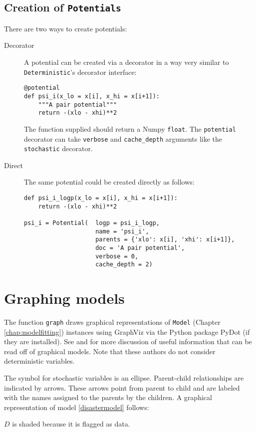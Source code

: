 \subsection*{Creation of \texttt{Potentials}}
There are two ways to create potentials:
\begin{description}
    \item[Decorator] A potential can be created via a decorator in a way very similar to \texttt{Deterministic}'s decorator interface:
\begin{verbatim}
@potential
def psi_i(x_lo = x[i], x_hi = x[i+1]):
    """A pair potential"""
    return -(xlo - xhi)**2
\end{verbatim}
The function supplied should return a Numpy \texttt{float}. The \texttt{potential} decorator can take \texttt{verbose} and \texttt{cache_depth} arguments like the \texttt{stochastic} decorator.
    \item[Direct] The same potential could be created directly as follows:
\begin{verbatim}
def psi_i_logp(x_lo = x[i], x_hi = x[i+1]):
    return -(xlo - xhi)**2
        
psi_i = Potential(  logp = psi_i_logp, 
                    name = 'psi_i',
                    parents = {'xlo': x[i], 'xhi': x[i+1]},
                    doc = 'A pair potential',
                    verbose = 0,
                    cache_depth = 2)
\end{verbatim}
\end{description}


\hypertarget{graphical}{}
\section*{Graphing models} \label{graphical}

The function \texttt{graph} draws graphical representations of \texttt{Model} (Chapter \ref{chap:modelfitting}) instances using GraphViz via the Python package PyDot (if they are installed). See \cite{dawidmarkov} and \cite{Jordan:2004p5439} for more discussion of useful information that can be read off of graphical models. Note that these authors do not consider deterministic variables.

The symbol for stochastic variables is an ellipse. Parent-child relationships are indicated by arrows. These arrows point from parent to child and are labeled with the names assigned to the parents by the children. A graphical representation of model \ref{disastermodel} follows:
\begin{center}
\end{center} 
$D$ is shaded because it is flagged as data.

